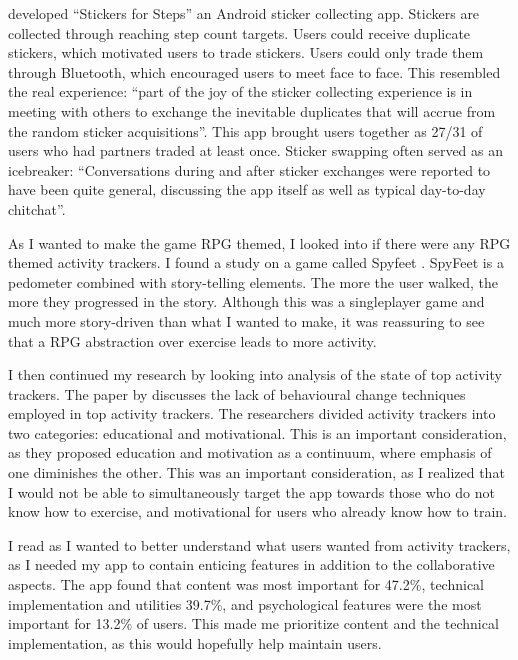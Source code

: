 \documentclass{l4proj}
\begin{document}
\citet{Stickers} developed ``Stickers for Steps'' an Android sticker collecting app. Stickers are collected through reaching step count targets. Users could receive duplicate stickers, which motivated users to trade stickers. Users could only trade them through Bluetooth, which encouraged users to meet face to face. This resembled the real experience: ``part of the joy of the sticker collecting experience is in meeting with others to exchange the inevitable duplicates that will accrue from the random sticker acquisitions''. This app brought users together as 27/31 of users who had partners traded at least once. Sticker swapping often served as an icebreaker: ``Conversations during and after sticker exchanges were reported to have been quite general, discussing the app itself as well as typical day-to-day chitchat''.

As I wanted to make the game RPG themed, I looked into if there were any RPG themed activity trackers. I found a study on a game called Spyfeet \citep{SpyFeet}. SpyFeet is a pedometer combined with story-telling elements. The more the user walked, the more they progressed in the story. Although this was a singleplayer game and much more story-driven than what I wanted to make, it was reassuring to see that a RPG abstraction over exercise leads to more activity.

I then continued my research by looking into analysis of the state of top activity trackers. The paper by \citet{Behavior_change} discusses the lack of behavioural change techniques employed in top activity trackers. The researchers divided activity trackers into two categories: educational and motivational. This is an important consideration, as they proposed education and motivation as a continuum, where emphasis of one diminishes the other. This was an important consideration, as I realized that I would not be able to simultaneously target the app towards those who do not know how to exercise, and motivational for users who already know how to train.

I read \citet{User_expectations} as I wanted to better understand what users wanted from activity trackers, as I needed my app to contain enticing features in addition to the collaborative aspects. The app found that content was most important for 47.2\%, technical implementation and utilities 39.7\%, and psychological features were the most important for 13.2\% of users. This made me prioritize content and the technical implementation, as this would hopefully help maintain users.
\end{document}
